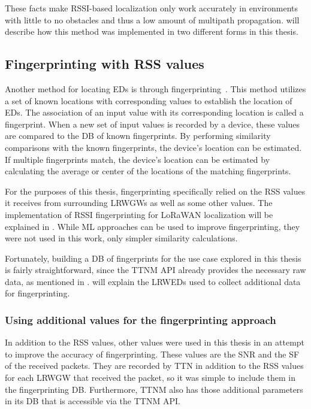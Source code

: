 These facts make \ac{RSSI}-based localization only work accurately in environments with little to no obstacles and thus a low amount of multipath propagation.
 will describe how this method was implemented in two different forms in this thesis.

\subsection{Fingerprinting with \acl{RSS} values}\label{sec:rssi-fingerprinting}

Another method for locating \aclp{ED} is through fingerprinting~\cite{xia_indoor_2017}.
This method utilizes a set of known locations with corresponding values to establish the location of \aclp{ED}.
The association of an input value with its corresponding location is called a fingerprint.
When a new set of input values is recorded by a device, these values are compared to the \ac{DB} of known fingerprints.
By performing similarity comparisons with the known fingerprints, the device's location can be estimated.
If multiple fingerprints match, the device's location can be estimated by calculating the average or center of the locations of the matching fingerprints.

For the purposes of this thesis, fingerprinting specifically relied on the \ac{RSS} values it receives from surrounding \aclp{LRWGW} as well as some other values.
The implementation of \ac{RSSI} fingerprinting for \ac{LoRaWAN} localization will be explained in .
While \ac{ML} approaches can be used to improve fingerprinting, they were not used in this work, only simpler similarity calculations.

Fortunately, building a \ac{DB} of fingerprints for the use case explored in this thesis is fairly straightforward, since the \ac{TTNM} \ac{API} already provides the necessary raw data, as mentioned in .
 will explain the \aclp{LRWED} used to collect additional data for fingerprinting.

\subsubsection{Using additional values for the fingerprinting approach}\label{sec:fingerprinting-additional-values}

In addition to the \ac{RSS} values, other values were used in this thesis in an attempt to improve the accuracy of fingerprinting.
These values are the \ac{SNR} and the \ac{SF} of the received packets.
They are recorded by \ac{TTN} in addition to the \ac{RSS} values for each \acl{LRWGW} that received the packet, so it was simple to include them in the fingerprinting \ac{DB}.
Furthermore, \ac{TTNM} also has those additional parameters in its \ac{DB} that is accessible via the \ac{TTNM} \ac{API}.